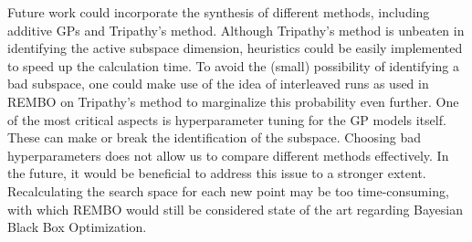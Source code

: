 Future work could incorporate the synthesis of different methods, including additive GPs and Tripathy's method.
Although Tripathy's method is unbeaten in identifying the active subspace dimension, heuristics could be easily implemented to speed up the calculation time.
To avoid the (small) possibility of identifying a bad subspace, one could make use of the idea of interleaved runs as used in REMBO on Tripathy's method to marginalize this probability even further.
One of the most critical aspects is hyperparameter tuning for the GP models itself.
These can make or break the identification of the subspace.
Choosing bad hyperparameters does not allow us to compare different methods effectively.
In the future, it would be beneficial to address this issue to a stronger extent.
Recalculating the search space for each new point may be too time-consuming, with which REMBO would still be considered state of the art regarding Bayesian Black Box Optimization.
 



